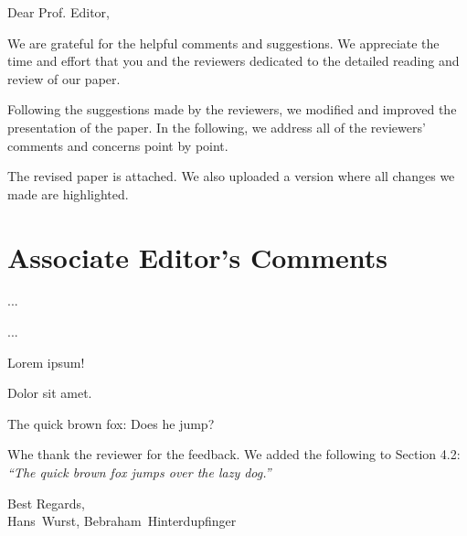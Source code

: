 \documentclass{responseletter}
\date{September 9, 2022}
\newcommand \theauthors {Hans~Wurst, Bebraham~Hinterdupfinger}
\begin{document}
\maketitle

Dear Prof. Editor,

We are grateful for the helpful comments and suggestions.
We appreciate the time and effort that you and the reviewers
dedicated to the detailed reading and review of our paper.

Following the suggestions made by the reviewers,
we modified and improved the presentation of the paper.
In the following, we address all of the reviewers' comments
and concerns point by point.

The revised paper is attached.
We also uploaded a version where all changes we made are highlighted.

\section*{Associate Editor's Comments}

\begin{comm*}
  ...
\end{comm*}

\begin{ans}
  ...
\end{ans}


\review

\begin{comm}
  Lorem ipsum!
\end{comm}
\begin{ans}
  Dolor sit amet.
\end{ans}


\review

\begin{comm}
  The quick brown fox: Does he jump?
\end{comm}

\begin{ans}
  Whe thank the reviewer for the feedback.
  We added the following to Section 4.2:
  \emph{“The quick brown fox jumps over the lazy dog.”}
\end{ans}

\vspace{2em}

Best Regards, \\
\theauthors

\end{document}
